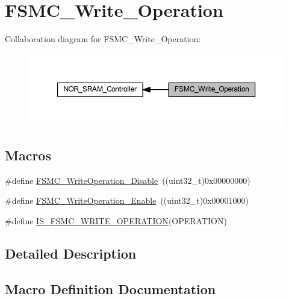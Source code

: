 \hypertarget{group___f_s_m_c___write___operation}{}\section{F\+S\+M\+C\+\_\+\+Write\+\_\+\+Operation}
\label{group___f_s_m_c___write___operation}
Collaboration diagram for F\+S\+M\+C\+\_\+\+Write\+\_\+\+Operation\+:
\nopagebreak
\begin{figure}[H]
\begin{center}
\leavevmode
\includegraphics[width=350pt]{group___f_s_m_c___write___operation}
\end{center}
\end{figure}
\subsection*{Macros}
\begin{DoxyCompactItemize}
\item 
\#define \hyperlink{group___f_s_m_c___write___operation_ga74176320484248f06abae854170f9d9f}{F\+S\+M\+C\+\_\+\+Write\+Operation\+\_\+\+Disable}~((uint32\+\_\+t)0x00000000)
\item 
\#define \hyperlink{group___f_s_m_c___write___operation_ga2478beb6dd8861b34a16b8a57a795e56}{F\+S\+M\+C\+\_\+\+Write\+Operation\+\_\+\+Enable}~((uint32\+\_\+t)0x00001000)
\item 
\#define \hyperlink{group___f_s_m_c___write___operation_ga87fc20d11761caa66c3e7d77a3a7d3e3}{I\+S\+\_\+\+F\+S\+M\+C\+\_\+\+W\+R\+I\+T\+E\+\_\+\+O\+P\+E\+R\+A\+T\+I\+ON}(O\+P\+E\+R\+A\+T\+I\+ON)
\end{DoxyCompactItemize}


\subsection{Detailed Description}


\subsection{Macro Definition Documentation}
\mbox{\label{group___f_s_m_c___write___operation_ga74176320484248f06abae854170f9d9f}} 
